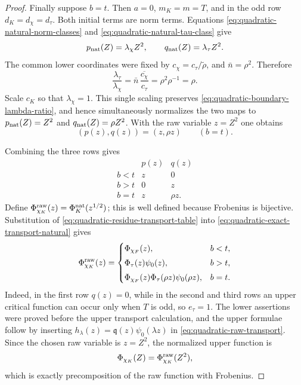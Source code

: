 \documentclass[11pt]{amsart}
\theoremstyle{definition}
\theoremstyle{remark}
\begin{document}
\begin{proof}
Finally suppose $b=t$.  Then $a=0$, $m_K=m=T$, and in the odd row
$d_K=d_\chi=d_\tau$.  Both initial terms are norm terms.  Equations
\eqref{eq:quadratic-natural-norm-classes} and
\eqref{eq:quadratic-natural-tau-class} give
\[
 p_{\rm nat}(Z)=\lambda_\chi Z^2,
 \qquad
 q_{\rm nat}(Z)=\lambda_\tau Z^2.
\]
The common lower coordinates were fixed by
$c_\chi=c_\tau/\widetilde\rho$, and $\bar n=\rho^2$.  Therefore
\begin{equation}\label{eq:quadratic-boundary-lambda-ratio}
 \frac{\lambda_\tau}{\lambda_\chi}
 =\bar n\,\overline{\frac{c_\chi}{c_\tau}}
 =\rho^2\rho^{-1}=\rho.
\end{equation}
Scale $c_K$ so that $\lambda_\chi=1$.  This single scaling preserves
\eqref{eq:quadratic-boundary-lambda-ratio}, and hence simultaneously
normalizes the two maps to
$p_{\rm nat}(Z)=Z^2$ and $q_{\rm nat}(Z)=\rho Z^2$.  With the raw
variable $z=Z^2$ one obtains
\begin{equation}\label{eq:quadratic-raw-classes-boundary}
 (p(z),q(z))=(z,\rho z)\qquad(b=t).
\end{equation}

Combining the three rows gives
\begin{equation}\label{eq:quadratic-residue-transport-table}
\begin{array}{c|c|c}
 &p(z)&q(z)\\ \hline
 b<t&z&0\\
 b>t&0&z\\
 b=t&z&\rho z.
\end{array}
\end{equation}
Define
$\Phi_{\chi_K}^{\rm raw}(z)=\Phi_K^{\rm nat}(z^{1/2})$; this is
well defined because Frobenius is bijective.  Substitution of
\eqref{eq:quadratic-residue-transport-table} into
\eqref{eq:quadratic-exact-transport-natural} gives
\begin{equation}\label{eq:quadratic-raw-transport}
 \Phi_{\chi_K}^{\rm raw}(z)=
 \begin{cases}
  \Phi_{\chi_F}(z),&b<t,\\[1mm]
  \Phi_\tau(z)\psi_0(z),&b>t,\\[1mm]
  \Phi_{\chi_F}(z)\Phi_\tau(\rho z)\psi_0(\rho z),&b=t.
 \end{cases}
\end{equation}
Indeed, in the first row $q(z)=0$, while in the second and third rows
an upper critical function can occur only when $T$ is odd, so
$e_\tau=1$.
The lower assertions were proved before the upper transport
calculation, and the upper formulae follow by inserting
$h_\lambda(z)=\mathfrak q(z)\psi_0(\lambda z)$ in
\eqref{eq:quadratic-raw-transport}.  Since the chosen raw variable is
$z=Z^2$, the normalized upper function is
\[
 \Phi_{\chi_K}(Z)=\Phi_{\chi_K}^{\rm raw}(Z^2),
\]
which is exactly precomposition of the raw function with Frobenius.
\end{proof}
\end{document}
